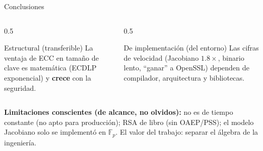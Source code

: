 \documentclass[aspectratio=169,11pt]{beamer}
\begin{document}
\begin{frame}{Conclusiones}
  \begin{columns}[t]
    \begin{column}{0.5\textwidth}
      \begin{block}{Estructural (transferible)}
        \small La ventaja de ECC en tamaño de clave es \alert{matemática} (ECDLP exponencial)
        y \textbf{crece} con la seguridad.
      \end{block}
    \end{column}
    \begin{column}{0.5\textwidth}
      \begin{block}{De implementación (del entorno)}
        \small Las cifras de velocidad (Jacobiano $1.8\times$, binario lento, ``ganar'' a
        OpenSSL) dependen de compilador, arquitectura y bibliotecas.
      \end{block}
    \end{column}
  \end{columns}
  \vfill
  \footnotesize \textbf{Limitaciones conscientes (de alcance, no olvidos):} no es de
  \alert{tiempo constante} (no apto para producción); RSA \alert{de libro} (sin OAEP/PSS);
  el modelo Jacobiano solo se implementó en $\mathbb{F}_p$.
  \vfill
  \centering \alert{El valor del trabajo: separar el álgebra de la ingeniería.}
\end{frame}
\end{document}
